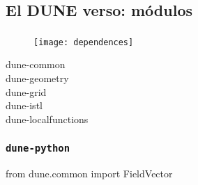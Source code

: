 \subsection{El DUNE verso: módulos}
\begin{frame}
	\frametitle{\secname}
	\framesubtitle{\subsecname}

	\begin{figure}[ht!]
		\centering
		\texttt{[image: dependences]}
	\end{figure}

	\begin{description}
		\item[dune-common]

		\item[dune-geometry]

		\item[dune-grid]

		\item[dune-istl]

		\item[dune-localfunctions]


	\end{description}

\end{frame}

{
\begin{frame}[plain]
\end{frame}
}

\begin{frame}
	\frametitle{\secname}
	\framesubtitle{\subsecname}
\end{frame}



\begin{frame}[fragile]
	\frametitle{\lstinline{dune-python}}

\begin{python}
from dune.common import FieldVector
\end{python}

\end{frame}

